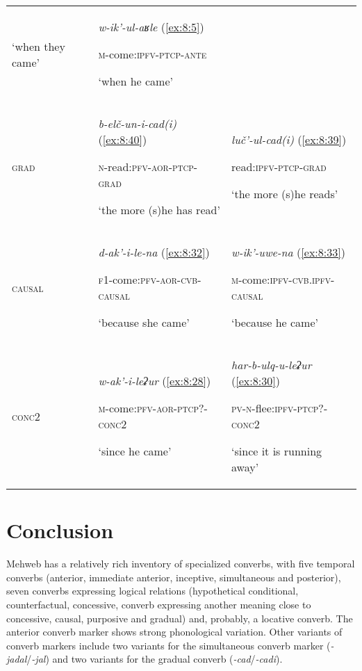 ﻿\documentclass[output=paper]{langsci/langscibook}
\begin{document}
\begin{table}[b]
\begin{tabular}{@{}lp{}<{\raggedright}p{}<{\raggedright}@{}}
`when they came' & \emph{w-ik'-ul-aʁle} (\ref{ex:8:5})

\textsc{m}-come:\textsc{ipfv}-\textsc{ptcp}-\textsc{ante}

`when he came'\tabularnewline
\textsc{grad} & \emph{b-elč-un-i-cad(i)} (\ref{ex:8:40})

\textsc{n}-read:\textsc{pfv}-\textsc{aor}-\textsc{ptcp}-\textsc{grad}

`the more (s)he has read' & \emph{luč'-ul-cad(i)} (\ref{ex:8:39})

read:\textsc{ipfv}-\textsc{ptcp}-\textsc{grad}

`the more (s)he reads'\tabularnewline
\textsc{causal} & \emph{d-ak'-i-le-na} (\ref{ex:8:32})

\textsc{f1}-come:\textsc{pfv}-\textsc{aor}-\textsc{cvb}-\textsc{causal}

`because she came' & \emph{w-ik'-uwe-na} (\ref{ex:8:33})

\textsc{m}-come:\textsc{ipfv}-\textsc{cvb.ipfv}-\textsc{causal}

`because he came'\tabularnewline
\textsc{conc2} & \emph{w-ak'-i-leʡur} (\ref{ex:8:28})

\textsc{m}-come:\textsc{pfv}-\textsc{aor}-\textsc{ptcp?}-\textsc{conc2}

`since he came' & \emph{har-b-ulq-u-leʡur} (\ref{ex:8:30})

\textsc{pv}-\textsc{n}-flee:\textsc{ipfv}-\textsc{ptcp?}-\textsc{conc2}

`since it is running away'\tabularnewline
\bottomrule
\end{tabular}
\end{table}

\normalsize

\section{Conclusion}\label{conclusion-9}

Mehweb has a relatively rich inventory of specialized converbs, with
five temporal converbs (anterior, immediate anterior, inceptive,
simultaneous and posterior), seven converbs expressing logical relations
(hypothetical conditional, counterfactual, concessive, converb
expressing another meaning close to concessive, causal, purposive and
gradual) and, probably, a locative converb. The anterior converb marker shows strong phonological
variation. Other variants of converb
markers include two variants for the simultaneous converb marker
(\emph{-jadal}/\emph{-jal}) and two variants for the gradual converb
(\emph{-cad}/\emph{-cadi}).
\end{document}

